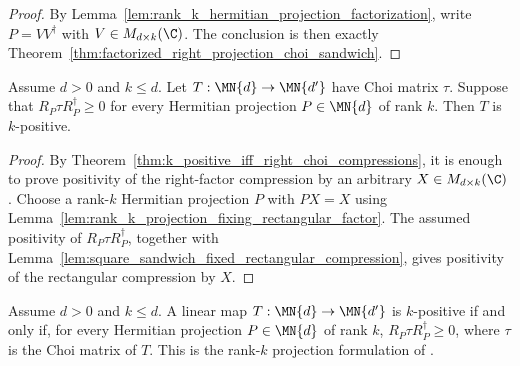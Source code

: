 \begin{proof}
    \leanok
    By Lemma~\ref{lem:rank_k_hermitian_projection_factorization}, write
    $P=VV^\dagger$ with $V\in M_{d\times k}(\C)$. The conclusion is then exactly
    Theorem~\ref{thm:factorized_right_projection_choi_sandwich}.
\end{proof}

\begin{theorem}
    \label{thm:rank_k_right_projection_choi_sandwich_converse}
    \leanok
    Assume $d>0$ and $k\le d$. Let
    $T:\MN{d}\to\MN{d'}$ have Choi matrix $\tau$. Suppose that
    $R_P\tau R_P^\dagger\geq0$ for every Hermitian projection
    $P\in\MN{d}$ of rank $k$. Then $T$ is $k$-positive.
\end{theorem}

\begin{proof}
    \leanok
    By Theorem~\ref{thm:k_positive_iff_right_choi_compressions}, it is enough
    to prove positivity of the right-factor compression by an arbitrary
    $X\in M_{d\times k}(\C)$. Choose a rank-$k$ Hermitian projection $P$ with
    $PX=X$ using
    Lemma~\ref{lem:rank_k_projection_fixing_rectangular_factor}. The assumed
    positivity of $R_P\tau R_P^\dagger$, together with
    Lemma~\ref{lem:square_sandwich_fixed_rectangular_compression}, gives
    positivity of the rectangular compression by $X$.
\end{proof}

\begin{theorem}
    \label{thm:rank_k_right_projection_choi_criterion}
    \leanok
    Assume $d>0$ and $k\le d$. A linear map
    $T:\MN{d}\to\MN{d'}$ is $k$-positive if and only if, for every
    Hermitian projection $P\in\MN{d}$ of rank $k$,
    $R_P\tau R_P^\dagger\geq0$, where $\tau$ is the Choi matrix of $T$.
    This is the rank-$k$ projection formulation of
    \cite[Chapter~3, Proposition~3.1]{Wolf2012Quantum}.
\end{theorem}


